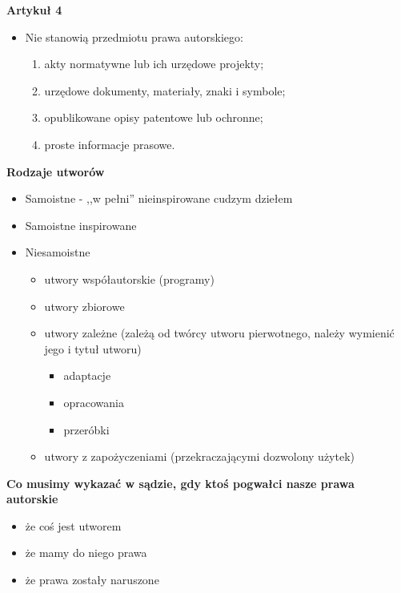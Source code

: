 \documentclass[12pt,a4paper]{article}
\begin{document}
\noindent
\textbf{Artykuł 4}
\begin{itemize}
\item Nie stanowią przedmiotu prawa autorskiego: 
	\begin{enumerate}
		\item akty normatywne lub ich urzędowe projekty; 
		\item urzędowe dokumenty, materiały, znaki i symbole; 
		\item opublikowane opisy patentowe lub ochronne; 
		\item proste informacje prasowe. 
	\end{enumerate}
\end{itemize} 

\noindent
\textbf{Rodzaje utworów}
\begin{itemize}
\item Samoistne - ,,w pełni'' nieinspirowane cudzym dziełem
\item Samoistne inspirowane
\item Niesamoistne
	\begin{itemize}
		\item utwory współautorskie (programy)
		\item utwory zbiorowe
		\item utwory zależne (zależą od twórcy utworu pierwotnego, należy wymienić jego i tytuł utworu)
			\begin{itemize}
				\item adaptacje
				\item opracowania
				\item przeróbki
			\end{itemize}
		\item utwory z zapożyczeniami (przekraczającymi dozwolony użytek) 
	\end{itemize}
\end{itemize}
\noindent
\textbf{Co musimy wykazać w sądzie, gdy ktoś pogwałci nasze prawa autorskie}
\begin{itemize}
\item że coś jest utworem
\item że mamy do niego prawa
\item że prawa zostały naruszone
\end{itemize}
\end{document}
